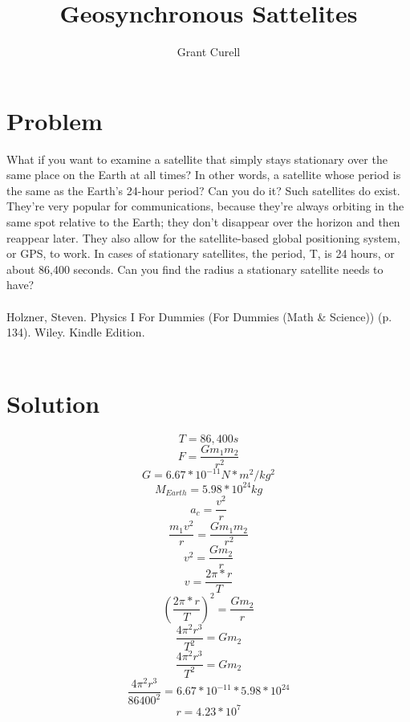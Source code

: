 \documentclass{article}
\title{Geosynchronous Sattelites}
\author{Grant Curell}
\begin{document}
\maketitle{}
\section{Problem}
What if you want to examine a satellite that simply stays stationary over the same place on the Earth at all times? In other words, a satellite whose period is the same as the Earth’s 24-hour period? Can you do it? Such satellites do exist. They’re very popular for communications, because they’re always orbiting in the same spot relative to the Earth; they don’t disappear over the horizon and then reappear later. They also allow for the satellite-based global positioning system, or GPS, to work. In cases of stationary satellites, the period, T, is 24 hours, or about 86,400 seconds. Can you find the radius a stationary satellite needs to have?
\\\\
Holzner, Steven. Physics I For Dummies (For Dummies (Math \& Science)) (p. 134). Wiley. Kindle Edition.
\\\\
\section{Solution}
\[ T=86,400s \]
\[ F=\frac{Gm_1m_2}{r^2} \]
\[ G=6.67*10^{-11}N*m^2/kg^2 \]
\[ M_{Earth}=5.98*10^24kg \]
\[ a_c=\frac{v^2}{r} \]
\[ \frac{m_1v^2}{r}=\frac{Gm_1m_2}{r^2} \]
\[ v^2=\frac{Gm_2}{r} \]
\[ v=\frac{2\pi*r}{T} \]
\[ (\frac{2\pi*r}{T})^2=\frac{Gm_2}{r} \]
\[ \frac{4\pi^2r^3}{T^2}=Gm_2 \]
\[ \frac{4\pi^2r^3}{T^2}=Gm_2 \]
\[ \frac{4\pi^2r^3}{86400^2}=6.67*10^{-11}*5.98*10^24 \]
\[ r=4.23*10^7 \]
\end{document}
